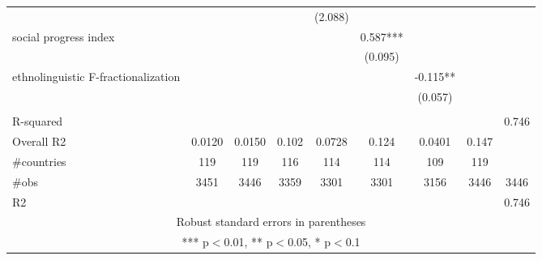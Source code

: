 \documentclass[]{article}
\begin{document}
\begin{tabular}{lcccccccc}
 &  &  &  & (2.088) &  &  &  &  \\
social progress index &  &  &  &  & 0.587*** &  &  &  \\
 &  &  &  &  & (0.095) &  &  &  \\
ethnolinguistic F-fractionalization &  &  &  &  &  & -0.115** &  &  \\
 &  &  &  &  &  & (0.057) &  &  \\
 &  &  &  &  &  &  &  &  \\
R-squared &  &  &  &  &  &  &  & 0.746 \\
Overall R2 & 0.0120 & 0.0150 & 0.102 & 0.0728 & 0.124 & 0.0401 & 0.147 &  \\
\#countries & 119 & 119 & 116 & 114 & 114 & 109 & 119 &  \\
\#obs & 3451 & 3446 & 3359 & 3301 & 3301 & 3156 & 3446 & 3446 \\
 R2 &  &  &  &  &  &  &  & 0.746 \\ \hline
\multicolumn{9}{c}{ Robust standard errors in parentheses} \\
\multicolumn{9}{c}{ *** p$<$0.01, ** p$<$0.05, * p$<$0.1} \\
\end{tabular}
\end{document}
